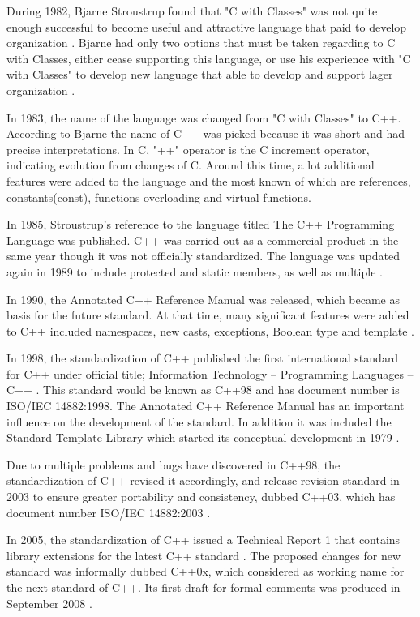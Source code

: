 \documentclass[11pt]{report}
\begin{document}
During 1982, Bjarne Stroustrup found that "C with Classes" was not quite enough successful to become useful and attractive language that paid to develop organization \cite{StroustrupHistory}. Bjarne had only two options that must be taken regarding to C with Classes, either cease supporting this language, or use his experience with "C with Classes" to develop new language that able to develop and support lager organization \cite{Stroustrup:1994:DesignEvolution}.

In 1983, the name of the language was changed from "C with Classes" to C++. According to Bjarne \cite{Stroustrup:1994:DesignEvolution} the name of C++ was picked because it was short and had precise interpretations. In C, "++" operator is the C increment operator, indicating evolution from changes of C.  Around this time, a lot additional features were added to the language and the most known of which are references, constants(const), functions overloading and virtual functions.

In 1985, Stroustrup's reference to the language titled The C++ Programming Language was published. C++ was carried out as a commercial product in the same year though it was not officially standardized. The language was updated again in 1989 to include protected and static members, as well as multiple \cite{CplusplusHistoryofCpp}.

In 1990, the Annotated C++ Reference Manual was released, which became as basis for the future standard. At that time, many significant features were added to C++ included namespaces, new casts, exceptions, Boolean type and template \cite{StroustrupHistory}.

In 1998, the standardization of C++ published the first international standard for C++ under official title; Information Technology -- Programming Languages -- C++ \cite{Josuttis:2012:CppStandard}. This standard would be known as C++98 and has document number is ISO/IEC 14882:1998. The Annotated C++ Reference Manual has an important influence on the development of the standard.  In addition it was included the Standard Template Library which started its conceptual development in 1979 \cite{CplusplusHistoryofCpp}.  

Due to multiple problems and bugs have discovered in C++98, the standardization of C++ revised it accordingly, and release revision standard in 2003 to ensure greater portability and consistency, dubbed C++03, which has document number ISO/IEC 14882:2003 \cite{Josuttis:2012:CppStandard}.

In 2005, the standardization of C++ issued a Technical Report 1 that contains library extensions for the latest C++ standard \cite{Josuttis:2012:CppStandard}. The proposed changes for new standard was informally dubbed C++0x, which considered as working name for the next standard of C++. Its first draft for formal comments was produced in September 2008 \cite{CplusplusHistoryofCpp}. 
\end{document}
